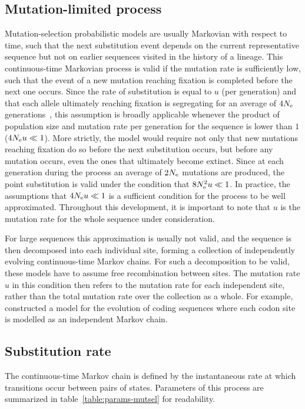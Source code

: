 \subsection{Mutation-limited process}
\label{subsec:mutation-limited-assumption}

Mutation-selection probabilistic models are usually Markovian with respect to time, such that the next \gls{substitution} event depends on the current representative sequence but not on earlier sequences visited in the history of a lineage.
This continuous-time Markovian process is valid if the mutation rate is sufficiently low, such that the event of a new mutation reaching fixation is completed before the next one occurs.
Since the rate of \gls{substitution} is equal to $u$ (per generation) and that each \gls{allele} ultimately reaching fixation is segregating for an average of $4 N_{\text{e}}$ generations~\citep{Kimura1969}, this assumption is broadly applicable whenever the product of population size and mutation rate per generation for the sequence is lower than $1$ ($4 N_{\text{e}} u \ll 1$).
More strictly, the model would require not only that new mutations reaching fixation do so before the next \gls{substitution} occurs, but before any mutation occurs, even the ones that ultimately become extinct.
Since at each generation during the process an average of $2N_{\text{e}}$ mutations are produced, the point \gls{substitution} is valid under the condition that $8N_{\text{e}}^2 u \ll 1$.
In practice, the assumptions that $4 N_{\text{e}} u \ll 1$ is a sufficient condition for the process to be well approximated.
Throughout this development, it is important to note that $u$ is the mutation rate for the whole sequence under consideration.

For large sequences this approximation is usually not valid, and the sequence is then decomposed into each individual site, forming a collection of independently evolving continuous-time \glspl{Markov chain}.
For such a decomposition to be valid, these models have to assume free \gls{recombination} between sites.
The mutation rate $u$ in this condition then refers to the mutation rate for each independent site, rather than the total mutation rate over the collection as a whole.
For example, \citet{Halpern1998} constructed a model for the evolution of coding sequences where each \gls{codon} site is modelled as an independent \gls{Markov chain}.

\subsection{Substitution rate}
The continuous-time \gls{Markov chain} is defined by the instantaneous rate at which transitions occur between pairs of states.
Parameters of this process are summarized in table~\ref{table:params-mutsel} for readability.


